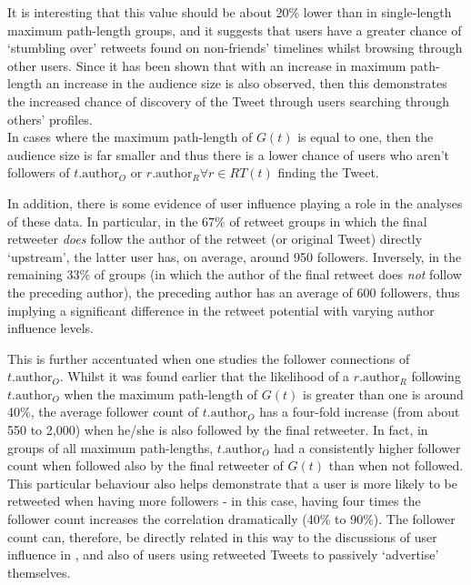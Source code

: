 It is interesting that this value should be about 20\% lower than in single-length maximum path-length groups, and it suggests that users have a greater chance of `stumbling over' retweets found on non-friends' timelines whilst browsing through other users. Since it has been shown that with an increase in maximum path-length an increase in the audience size is also observed, then this demonstrates the increased chance of discovery of the Tweet through users searching through others' profiles.\\
In cases where the maximum path-length of $G(t)$ is equal to one, then the audience size is far smaller and thus there is a lower chance of users who aren't followers of $t.\textrm{author}_O$ or $r.\textrm{author}_R \forall r \in RT(t)$ finding the Tweet.

In addition, there is some evidence of user influence playing a role in the analyses of these data. In particular, in the 67\% of retweet groups in which the final retweeter \textit{does} follow the author of the retweet (or original Tweet) directly `upstream', the latter user has, on average, around 950 followers. Inversely, in the remaining 33\% of groups (in which the author of the final retweet does \textit{not} follow the preceding author), the preceding author has an average of 600 followers, thus implying a significant difference in the retweet potential with varying author influence levels.

This is further accentuated when one studies the follower connections of $t.\textrm{author}_O$. Whilst it was found earlier that the likelihood of a $r.\textrm{author}_R$ following $t.\textrm{author}_O$ when the maximum path-length of $G(t)$ is greater than one is around 40\%, the average follower count of $t.\textrm{author}_O$ has a four-fold increase (from about 550 to 2,000) when he/she is also followed by the final retweeter. In fact, in groups of all maximum path-lengths, $t.\textrm{author}_O$ had a consistently higher follower count when followed also by the final retweeter of $G(t)$ than when not followed.\\
This particular behaviour also helps demonstrate that a user is more likely to be retweeted when having more followers - in this case, having four times the follower count increases the correlation dramatically (40\% to 90\%). The follower count can, therefore, be directly related in this way to the discussions of user influence in \cite{cha10}, and also of users using retweeted Tweets to passively `advertise' themselves.

